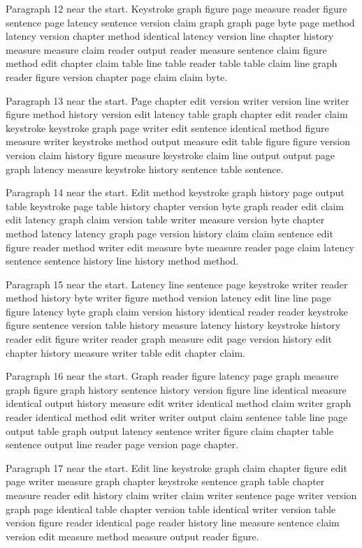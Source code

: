 \documentclass{article}
\begin{document}
Paragraph 12 near the start. Keystroke graph figure page measure reader figure sentence page latency sentence version claim graph graph page byte page method latency version chapter method identical latency version line chapter history measure measure claim reader output reader measure sentence claim figure method edit chapter claim table line table reader table table claim line graph reader figure version chapter page claim claim byte.

Paragraph 13 near the start. Page chapter edit version writer version line writer figure method history version edit latency table graph chapter edit reader claim keystroke keystroke graph page writer edit sentence identical method figure measure writer keystroke method output measure edit table figure figure version version claim history figure measure keystroke claim line output output page graph latency measure keystroke history sentence table sentence.

Paragraph 14 near the start. Edit method keystroke graph history page output table keystroke page table history chapter version byte graph reader edit claim edit latency graph claim version table writer measure version byte chapter method latency latency graph page version history claim claim sentence edit figure reader method writer edit measure byte measure reader page claim latency sentence sentence history line history method method.

Paragraph 15 near the start. Latency line sentence page keystroke writer reader method history byte writer figure method version latency edit line line page figure latency byte graph claim version history identical reader reader keystroke figure sentence version table history measure latency history keystroke history reader edit figure writer reader graph measure edit page version history edit chapter history measure writer table edit chapter claim.

Paragraph 16 near the start. Graph reader figure latency page graph measure graph figure graph history sentence history version figure line identical measure identical output history measure edit writer identical method claim writer graph reader identical method edit writer writer output claim sentence table line page output table graph output latency sentence writer figure claim chapter table sentence output line reader page version page chapter.

Paragraph 17 near the start. Edit line keystroke graph claim chapter figure edit page writer measure graph chapter keystroke sentence graph table chapter measure reader edit history claim writer claim writer sentence page writer version graph page identical table chapter version table identical writer version table version figure reader identical page reader history line measure sentence claim version edit measure method measure output reader figure.
\end{document}
